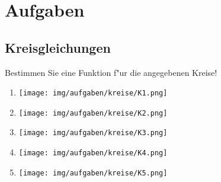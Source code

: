 \section{Aufgaben}
\subsection{Kreisgleichungen}
Bestimmen Sie eine Funktion f"ur die angegebenen Kreise!
\begin{enumerate}
\item{\texttt{[image: img/aufgaben/kreise/K1.png]} }
\item{\texttt{[image: img/aufgaben/kreise/K2.png]} }
\item{\texttt{[image: img/aufgaben/kreise/K3.png]} }
\item{\texttt{[image: img/aufgaben/kreise/K4.png]} }
\item{\texttt{[image: img/aufgaben/kreise/K5.png]} }
\end{enumerate}
